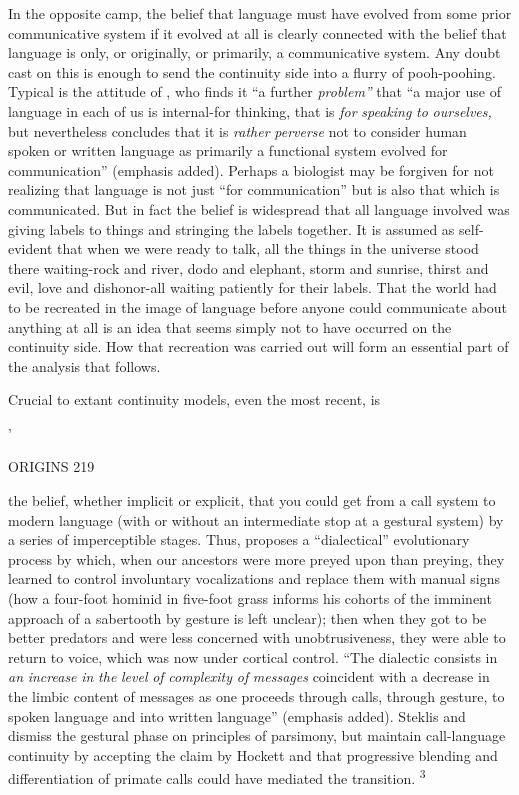 In the opposite camp, the belief that language must have evolved from some prior communicative system if it evolved at all is clearly connected with the belief that language is only, or originally, or pri\-marily, a communicative system. Any doubt cast on this is enough to send the continuity side into a flurry of pooh-poohing. Typical is the attitude of \citet[175]{Young1978}, who finds it ``a further \textit{problem'' }that ``a major use of language in each of us is internal-for thinking, that is \textit{for} \textit{speaking} \textit{to} \textit{ourselves,{\textquotedbl}} but nevertheless concludes that it is \textit{{\textquotedbl}rather} \textit{perverse }not to consider human spoken or written language as primarily a functional system evolved for communication'' (emphasis added). Perhaps a biologist may be forgiven for not realizing that language is not just ``for communication'' but is also that which is com\-municated. But in fact the belief is widespread that all language in\-volved was giving labels to things and stringing the labels together. It is assumed as self-evident that when we were ready to talk, all the things in the universe stood there waiting-rock and river, dodo and elephant, storm and sunrise, thirst and evil, love and dishonor-all waiting patiently for their labels. That the world had to be recreated in the image of language before anyone could communicate about any\-thing at all is an idea that seems simply not to have occurred on the continuity side. How that recreation was carried out will form an essential part of the analysis that follows.

Crucial to extant continuity models, even the most recent, is

'

ORIGINS 219

the belief, whether implicit or explicit, that you could get from a call system to modern language (with or without an intermediate stop at a gestural system) by a series of imperceptible stages. Thus, \citet{Stephenson1979} proposes a ``dialectical'' evolutionary process by which, when our ancestors were more preyed upon than preying, they learned to control involuntary vocalizations and replace them with manual signs (how a four-foot hominid in five-foot grass informs his cohorts of the imminent approach of a sabertooth by gesture is left unclear); then when they got to be better predators and were less concerned with unobtrusiveness, they were able to return to voice, which was now under cortical control. ``The dialectic consists in \textit{an} \textit{increase} \textit{in} \textit{the} \textit{level} \textit{o}\textit{f} \textit{complexity} \textit{of} \textit{messages} coincident with a decrease in the limbic content of messages as one proceeds through calls, through gesture, to spoken language and into written language'' (emphasis added). Steklis and \citet{Raleigh1979} dismiss the gestural phase on principles of parsimony, but maintain call-language continuity by accepting the claim by Hockett and \citet{Ascher1964} that progressive blending and differentiation of primate calls could have mediated the transition. \textsuperscript{3}

